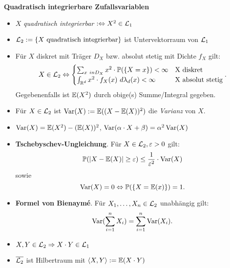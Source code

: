\textbf{Quadratisch integrierbare Zufallsvariablen}
\begin{itemize}
\item $X$ \textit{quadratisch integrierbar} $:\Leftrightarrow X^2\in\mathcal{L}_1$

\item $\mathcal{L}_2 := \{X \text{ quadratisch integrierbar}\}$ ist Untervektorraum von $\mathcal{L}_1$

\item Für $X$ diskret mit Träger $D_X$ bzw. absolut stetig mit Dichte $f_X$ gilt:
  \[
    X\in\mathcal{L}_2\Leftrightarrow
    \begin{cases}
    \sum_{x\ in D_X} x^2 \cdot \mathbb{P}(\{X=x\}) < \infty			& \text{X diskret} \\
    \int_{\mathbb{R}^d} x^2\cdot f_X(x)~d\lambda_d(x) < \infty		& \text{X absolut stetig}
    \end{cases}.
  \]
Gegebenenfalls ist $\mathbb{E}(X^2)$ durch obige(s) Summe/Integral gegeben.

\item Für $X\in\mathcal{L}_2$ ist $\operatorname{Var}(X) := \mathbb{E}((X-\mathbb{E}(X))^2)$ die \textit{Varianz} von $X$.

\item $\operatorname{Var}(X) = \mathbb{E}(X^2) - (\mathbb{E}(X))^2$,
  \quad $\operatorname{Var}(\alpha \cdot X + \beta) = \alpha^2\operatorname{Var}(X)$

\item \textbf{Tschebyschev-Ungleichung}. Für $X\in\mathcal{L}_2, \varepsilon > 0$ gilt:
  \[
    \mathbb{P}(|X-\mathbb{E}(X)| \geq \varepsilon) \leq \frac{1}{\varepsilon^2} \cdot \operatorname{Var}(X)
  \]
  sowie
  \[
    \operatorname{Var}(X) = 0 \Leftrightarrow \mathbb{P}(\{X=\mathbb{E}(x)\}) = 1.
  \]

\item \textbf{Formel von Bienaymé}. Für $X_1,\ldots,X_n\in\mathcal{L}_2$ unabhängig gilt:
  \[
    \operatorname{Var}(\sum_{i=1}^n X_i) = \sum_{i=1}^n \operatorname{Var}(X_i).
  \]

\item $X,Y\in\mathcal{L}_2 \Rightarrow X \cdot Y \in\mathcal{L}_1$

\item $\overline{\mathcal{L}_2}$ ist Hilbertraum mit $\langle X,Y \rangle := \mathbb{E}(X \cdot Y)$
\end{itemize}
\hspace{3em}

